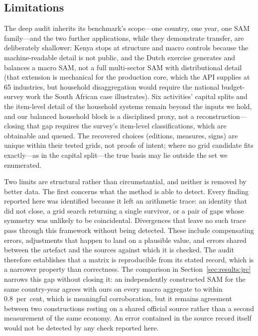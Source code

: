 \subsection{Limitations}

The deep audit inherits its benchmark's scope---one country, one year, one
SAM family---and the two further applications, while they demonstrate
transfer, are deliberately shallower: Kenya stops at structure and macro
controls because the machine-readable detail is not public, and the Dutch
exercise generates and balances a macro SAM, not a full multi-sector SAM with
distributional detail (that extension is mechanical for the production
core, which the API supplies at 65 industries, but household disaggregation
would require the national budget-survey work the South African case
illustrates). Six activities' capital splits and the item-level detail of the
household systems remain beyond the inputs we hold, and our
balanced household block is a disciplined proxy, not a reconstruction---
closing that gap requires the survey's item-level classifications, which
are obtainable and queued. The recovered choices (editions, measures,
signs) are unique within their tested grids, not proofs of intent; where
no grid candidate fits exactly---as in the capital split---the true basis
may lie outside the set we enumerated.

Two limits are structural rather than circumstantial, and neither is
removed by better data. The first concerns what the method is able to
detect. Every finding reported here was identified because it left an
arithmetic trace: an identity that did not close, a grid search returning
a single survivor, or a pair of gaps whose symmetry was unlikely to be
coincidental. Divergences that leave no such trace pass through this
framework without being detected. These include compensating errors,
adjustments that happen to land on a plausible value, and errors shared
between the artefact and the sources against which it is checked. The
audit therefore establishes that a matrix is reproducible from its stated
record, which is a narrower property than correctness. The comparison in
Section~\ref{sec:results:jrc} narrows this gap without closing it: an
independently constructed SAM for the same country-year agrees with ours
on every macro aggregate to within 0.8~per~cent, which is meaningful
corroboration, but it remains agreement between two constructions resting
on a shared official source rather than a second measurement of the same
economy. An error contained in the source record itself would not be
detected by any check reported here.

